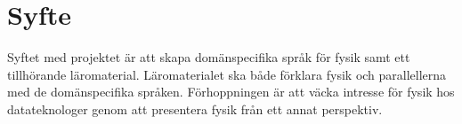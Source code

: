\documentclass[12pt,a4paper]{article}
\begin{document}
%
%
%
%
%
%

\section{Syfte}

Syftet med projektet är att skapa domänspecifika språk för fysik samt ett tillhörande läromaterial. Läromaterialet ska både förklara fysik och parallellerna med de domänspecifika språken. Förhoppningen är att väcka intresse för fysik hos datateknologer genom att presentera fysik från ett annat perspektiv.

%
\end{document}
